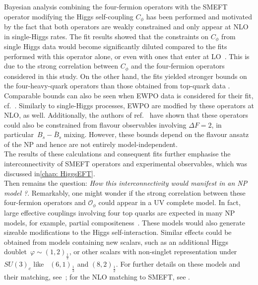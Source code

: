 	Bayesian analysis combining the four-fermion operators with the SMEFT operator modifying the Higgs self-coupling $C_\phi$ has been performed and motivated by the fact that both operators are weakly constrained and only appear at NLO in single-Higgs rates. The fit results showed that the constraints on $C_\phi$ from single Higgs data would become significantly diluted compared to the fits performed with this operator alone, or even with ones that enter at LO~\cite{Gorbahn:2016uoy, Degrassi:2016wml, Bizon:2016wgr, Maltoni:2017ims, Degrassi:2021uik}. This is due to the strong correlation between $C_\phi$ and the four-fermion operators considered in this study. On the other hand, the fits yielded stronger bounds on the four-heavy-quark operators than those obtained from top-quark data \cite{Ethier:2021bye, Hartland:2019bjb}. Comparable bounds can also be seen when EWPO data is considered for their fit, cf.~\cite{Dawson:2022bxd}. Similarly to single-Higgs processes, EWPO are modfied by these operators at NLO, as well. Additionally, the authors of ref.~\cite{Silvestrini:2018dos} have shown that these operators could also be constrained from flavour observables involving $\Delta F=2$, in particular~$B_s -\bar{B}_s$ mixing. However, these bounds depend on the flavour ansatz of the NP and hence are not entirely model-independent. \\ The results of these calculations and consequent fits further emphasise the interconnectivity of SMEFT operators and experimental observables, which was discussed in\autoref{chap: HiggsEFT}. \\
	Then remains the question: \textit{How this interconnectivity would manifest in an NP model ?}. Remarkably, one might wonder if the strong correlation between these four-fermion operators and $\mathcal{O}_\phi$ could appear in a UV complete model. In fact, large effective couplings involving four top quarks are expected in many NP models, for example, partial compositeness~\cite{Banelli:2020iau}. These models would also generate sizeable modifications to the Higgs self-interaction. Similar effects could be obtained from models containing new scalars, such as an additional Higgs doublet~$\varphi\sim (1,2)_{\frac 12}$, or other scalars with non-singlet representation under $SU(3)_c$ like~ $(6,1)_{\frac 1 3}$ and $(8,2)_{\frac 1 2}$. For further details on these models and their matching, see~\cite{deBlas:2017xtg}; for the NLO matching to SMEFT, see \cite{Anisha:2021hgc}. 